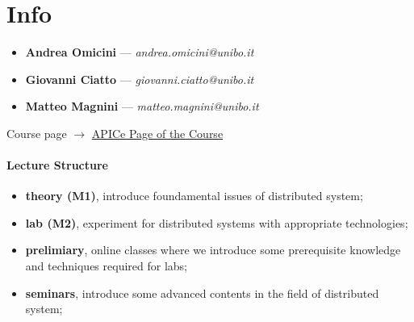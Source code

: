 \documentclass[11pt, a4paper]{article}
\begin{document}
\makefront{}

\tableofcontents

\newpage

\section{Info}\label{sec:info} %
\begin{itemize}
    \item \textbf{Andrea Omicini} --- \textit{andrea.omicini@unibo.it}
    \item \textbf{Giovanni Ciatto} --- \textit{giovanni.ciatto@unibo.it}
    \item \textbf{Matteo Magnini} --- \textit{matteo.magnini@unibo.it}
\end{itemize}
Course page $\longrightarrow$ \hyperlink{http://apice.unibo.it/xwiki/bin/view/Course/Ds2526}{APICe Page of the Course}
%
\paragraph{Lecture Structure}\label{par:lecture_structure} %
\begin{itemize}
    \item[] \textbf{theory (M1)}, introduce foundamental issues of distributed system;
    \item[] \textbf{lab (M2)}, experiment for distributed systems with appropriate technologies;
    \item[] \textbf{prelimiary}, online classes where we introduce some prerequisite knowledge and techniques required for labs;
    \item[] \textbf{seminars}, introduce some advanced contents in the field of distributed system;
\end{itemize}
%
\end{document}
